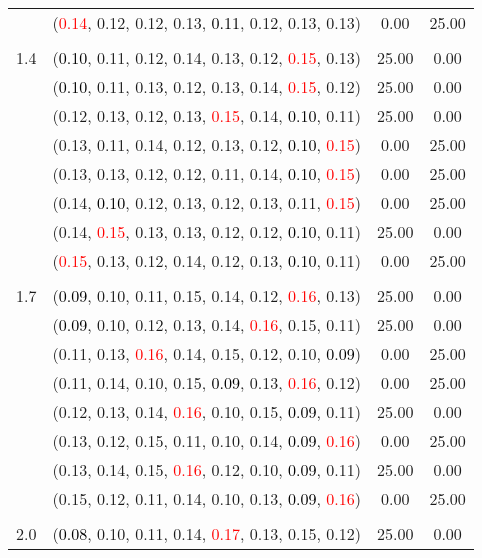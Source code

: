 \documentclass[10pt,a4paper]{report}
\begin{document}
\begin{center}
\begin{longtable}{clcc}
			&(\textcolor{red}{0.14}, 0.12, 0.12, 0.13, \textcolor{black}{0.11}, 0.12, 0.13, 0.13)&0.00&25.00\\
		&&&\\
		1.4			&(\textcolor{black}{0.10}, 0.11, 0.12, 0.14, 0.13, 0.12, \textcolor{red}{0.15}, 0.13)&25.00&0.00\\
			&(\textcolor{black}{0.10}, 0.11, 0.13, 0.12, 0.13, 0.14, \textcolor{red}{0.15}, 0.12)&25.00&0.00\\
			&(0.12, 0.13, 0.12, 0.13, \textcolor{red}{0.15}, 0.14, \textcolor{black}{0.10}, 0.11)&25.00&0.00\\
			&(0.13, 0.11, 0.14, 0.12, 0.13, 0.12, \textcolor{black}{0.10}, \textcolor{red}{0.15})&0.00&25.00\\
			&(0.13, 0.13, 0.12, 0.12, 0.11, 0.14, \textcolor{black}{0.10}, \textcolor{red}{0.15})&0.00&25.00\\
			&(0.14, \textcolor{black}{0.10}, 0.12, 0.13, 0.12, 0.13, 0.11, \textcolor{red}{0.15})&0.00&25.00\\
			&(0.14, \textcolor{red}{0.15}, 0.13, 0.13, 0.12, 0.12, \textcolor{black}{0.10}, 0.11)&25.00&0.00\\
			&(\textcolor{red}{0.15}, 0.13, 0.12, 0.14, 0.12, 0.13, \textcolor{black}{0.10}, 0.11)&0.00&25.00\\
		&&&\\
		1.7			&(\textcolor{black}{0.09}, 0.10, 0.11, 0.15, 0.14, 0.12, \textcolor{red}{0.16}, 0.13)&25.00&0.00\\
			&(\textcolor{black}{0.09}, 0.10, 0.12, 0.13, 0.14, \textcolor{red}{0.16}, 0.15, 0.11)&25.00&0.00\\
			&(0.11, 0.13, \textcolor{red}{0.16}, 0.14, 0.15, 0.12, 0.10, \textcolor{black}{0.09})&0.00&25.00\\
			&(0.11, 0.14, 0.10, 0.15, \textcolor{black}{0.09}, 0.13, \textcolor{red}{0.16}, 0.12)&0.00&25.00\\
			&(0.12, 0.13, 0.14, \textcolor{red}{0.16}, 0.10, 0.15, \textcolor{black}{0.09}, 0.11)&25.00&0.00\\
			&(0.13, 0.12, 0.15, 0.11, 0.10, 0.14, \textcolor{black}{0.09}, \textcolor{red}{0.16})&0.00&25.00\\
			&(0.13, 0.14, 0.15, \textcolor{red}{0.16}, 0.12, 0.10, \textcolor{black}{0.09}, 0.11)&25.00&0.00\\
			&(0.15, 0.12, 0.11, 0.14, 0.10, 0.13, \textcolor{black}{0.09}, \textcolor{red}{0.16})&0.00&25.00\\
		&&&\\
		2.0			&(\textcolor{black}{0.08}, 0.10, 0.11, 0.14, \textcolor{red}{0.17}, 0.13, 0.15, 0.12)&25.00&0.00\\

\end{longtable}
\end{center}
\end{document}
